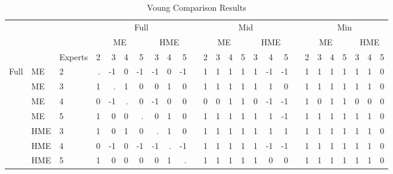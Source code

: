 \documentclass[12pt]{article}
\theoremstyle{definition}
\begin{document}
\begin{landscape}
\begin{table}[t!] \centering
  \caption{Voung Comparison Results}
  \begin{threeparttable}
    {\footnotesize
    \begin{tabular}[r]{l l l r r r r r r r r r r r r r r r r r r r r r r r}
    \cmidrule{1-26}
         &     &         &  \multicolumn{7}{c}{Full}                         &&  \multicolumn{7}{c}{Mid}                          &&  \multicolumn{7}{c}{Min}                         \\
         &     &         &  \multicolumn{4}{c}{ME} & \multicolumn{3}{c}{HME} &&  \multicolumn{4}{c}{ME} & \multicolumn{3}{c}{HME} && \multicolumn{4}{c}{ME} & \multicolumn{3}{c}{HME} \\
        \cmidrule(l){4-7} \cmidrule(lr){8-10}              \cmidrule(l){12-15} \cmidrule(l){16-18}             \cmidrule(l){20-23} \cmidrule(l){24-26}
         &     & Experts & 2   &  3  &  4  &  5  &  3   &  4   &  5          && 2   &  3  &  4  &  5  &  3   &  4   &  5          &&  2  &  3  &  4  &  5  &  3   &  4   &  5         \\
    \cmidrule{3-26}
Full     & ME  & 2       &  .  & -1  &  0  & -1  & -1   &  0   &  -1          &&  1  &   1 &  1  &  1  &  1   & -1   &  -1          &&  1  &  1  &  1  &  1  &  1   &  1   &  0       \\
         & ME  & 3       &  1  &  .  &  1  &  0  &  0   &  1   &   0          &&  1  &   1 &  1  &  1  &  1   &  1   &   0          &&  1  &  1  &  1  &  1  &  1   &  1   &  0       \\
         & ME  & 4       &  0  & -1  &  .  &  0  & -1   &  0   &   0          &&  0  &   0 &  1  &  1  &  0   & -1   &  -1          &&  1  &  0  &  1  &  1  &  0   &  0   &  0       \\
         & ME  & 5       &  1  &  0  &  0  &  .  &  0   &  1   &   0          &&  1  &   1 &  1  &  1  &  1   &  1   &  -1          &&  1  &  1  &  1  &  1  &  1   &  1   &  0       \\
         & HME & 3       &  1  &  0  &  1  &  0  &  .   &  1   &   0          &&  1  &   1 &  1  &  1  &  1   &  1   &   1          &&  1  &  1  &  1  &  1  &  1   &  1   &  0       \\
         & HME & 4       &  0  & -1  &  0  & -1  & -1   &  .   &  -1          &&  1  &   1 &  1  &  1  &  1   & -1   &  -1          &&  1  &  1  &  1  &  1  &  1   &  1   &  0       \\
         & HME & 5       &  1  &  0  &  0  &  0  &  0   &  1   &   .          &&  1  &   1 &  1  &  1  &  1   &  0   &   0          &&  1  &  1  &  1  &  1  &  1   &  1   &  0       \\

\end{tabular}}
\end{threeparttable}
\end{table}
\end{landscape}
\end{document}
